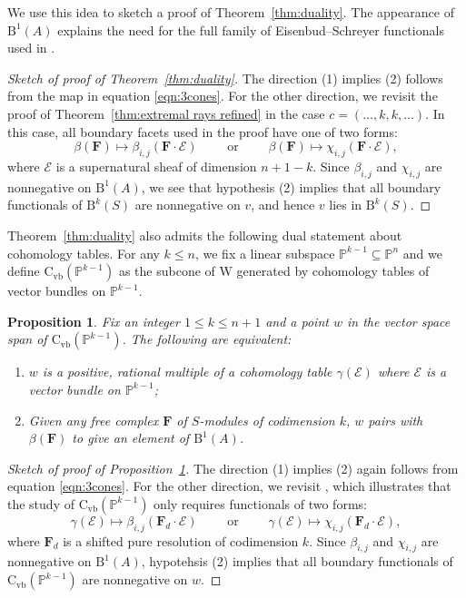 \documentclass[12pt]{amsart}
\newtheorem{prop}[lemma]{Proposition}
\theoremstyle{definition}
\theoremstyle{remark}
\newcommand{\PP}{\mathbb{P}}
\newcommand{\WW}{\mathrm{W}}
\newcommand{\cc}{c}
\newcommand{\cE}{\mathcal{E}}
\newcommand{\FF}{\mathbf{F}}
\newcommand{\CvbQ}{\mathrm{C}_{\text{vb}}}
\newcommand{\BBQ}{\mathrm{B}}
\begin{document}
We use this idea to sketch a proof of Theorem~\ref{thm:duality}.  The 
 appearance of $\BBQ^1(A)$ explains the need for the full family of Eisenbud--Schreyer functionals used in \cite{eis-schrey1}.
\begin{proof}[Sketch of proof of Theorem~\ref{thm:duality}]
The direction (1) implies (2) follows from the map in equation \eqref{eqn:3cones}. For the other direction, we revisit the proof of Theorem~\ref{thm:extremal rays refined} in the case $\cc=(\dots, k,k,\dots)$.  In this case, all boundary facets used in the proof have one of two forms:
\[
\beta(\FF)\mapsto\beta_{i,j}(\FF\cdot \cE) \qquad \text{ or } \qquad \beta(\FF)\mapsto\chi_{i,j}(\FF\cdot \cE),
\]
where $\cE$ is a supernatural sheaf of dimension $n+1-k$.  Since $\beta_{i,j}$ and $\chi_{i,j}$ are nonnegative on $\BBQ^1(A)$, we see that hypothesis (2) implies that all boundary functionals of $\BBQ^k(S)$ are nonnegative on $v$, and hence $v$ lies in $\BBQ^k(S)$.
\end{proof}
%
Theorem~\ref{thm:duality} also admits the following dual statement about cohomology tables.  For any $k\leq  n$, we fix a linear subspace $\PP^{k-1}\subseteq \PP^n$ and we define $\CvbQ(\PP^{k-1})$ as the subcone of $\WW$ generated by cohomology tables of vector bundles on $\PP^{k-1}$.
\begin{prop}\label{prop:other}
Fix an integer $1\leq k\leq n+1$ and a point $w$ in the vector space span of $\CvbQ(\PP^{k-1})$.   The following are equivalent:
\begin{enumerate}
	\item   $w$ is a positive, rational multiple of a cohomology table $\gamma(\cE)$ where $\cE$ is a vector bundle on $\PP^{k-1}$;
	\item  Given any free complex $\FF$ of $S$-modules of codimension $k$, $w$ pairs with $\beta(\FF)$ to give an element of $\BBQ^1(A)$.
\end{enumerate}
\end{prop}
\begin{proof}[Sketch of proof of Proposition~\ref{prop:other}]
The direction (1) implies (2) again follows from equation \eqref{eqn:3cones}.  For the other direction, we revisit \cite[Proof of Theorem~0.5]{eis-schrey1}, which illustrates that the study of $\CvbQ(\PP^{k-1})$ only requires functionals of two forms:
\[
\gamma(\cE)\mapsto\beta_{i,j}(\FF_d\cdot \cE) \qquad \text{ or } \qquad \gamma(\cE)\mapsto\chi_{i,j}(\FF_d\cdot \cE),
\]
where $\FF_d$ is a shifted pure resolution of codimension $k$.  Since $\beta_{i,j}$ and $\chi_{i,j}$ are nonnegative on $\BBQ^1(A)$, hypotehsis (2) implies that all boundary functionals of $\CvbQ(\PP^{k-1})$ are nonnegative on $w$.
\end{proof}
\end{document}
